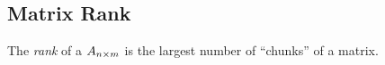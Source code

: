 \subsection{Matrix Rank}\label{subsec:Matrix_Rank}
\begin{definition}[Rank]\label{def:Matrix_Rank}
  The \emph{rank} of a  $A_{n \times m}$ is the largest number of  ``chunks'' of a matrix.

\end{definition}

